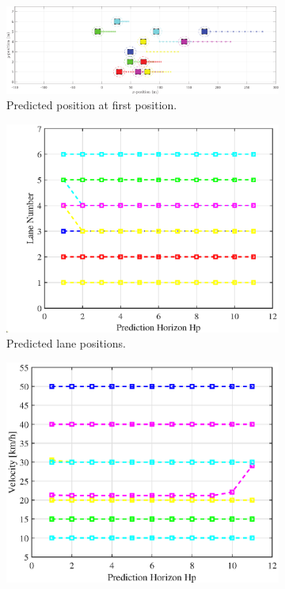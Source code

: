 \begin{figure}[H]
\centering
\begin{subfigure}[t]{\textwidth}
    \includegraphics[width=\textwidth]{Kap6/obs_avoid/obs_avoid_traj40.eps}
    \caption{Predicted position at first position.}
    \label{fig:first}
\end{subfigure}
\vspace{1cm}
\begin{subfigure}[b]{0.45\textwidth}
    \includegraphics[width=\textwidth]{Kap6/obs_avoid/obs_avoid_lane40.eps}
    \caption{Predicted lane positions.}
    \label{fig:second}
\end{subfigure}
\hfill
\begin{subfigure}[b]{0.45\textwidth}
    \includegraphics[width=\textwidth]{Kap6/obs_avoid/obs_avoid_vel40.eps}

\end{subfigure}
\end{figure}

